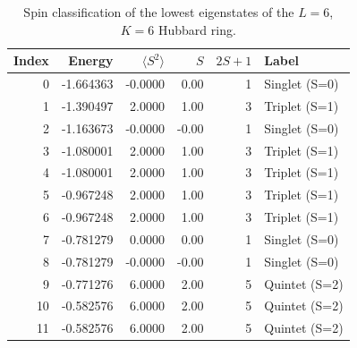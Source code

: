 \begin{table}[htbp]
  \centering
  \caption{Spin classification of the lowest eigenstates of the $L=6$, $K=6$ Hubbard ring.}
  \label{tab:spin-l6-ne6-31d31f}
  \begin{tabular}{rrrrrl}
    \hline\hline
    Index & Energy & $\langle S^2\rangle$ & $S$ & $2S+1$ & Label \\
    \hline
    0 & -1.664363 & -0.0000 & 0.00 & 1 & Singlet (S=0) \\
    1 & -1.390497 & 2.0000 & 1.00 & 3 & Triplet (S=1) \\
    2 & -1.163673 & -0.0000 & -0.00 & 1 & Singlet (S=0) \\
    3 & -1.080001 & 2.0000 & 1.00 & 3 & Triplet (S=1) \\
    4 & -1.080001 & 2.0000 & 1.00 & 3 & Triplet (S=1) \\
    5 & -0.967248 & 2.0000 & 1.00 & 3 & Triplet (S=1) \\
    6 & -0.967248 & 2.0000 & 1.00 & 3 & Triplet (S=1) \\
    7 & -0.781279 & 0.0000 & 0.00 & 1 & Singlet (S=0) \\
    8 & -0.781279 & -0.0000 & -0.00 & 1 & Singlet (S=0) \\
    9 & -0.771276 & 6.0000 & 2.00 & 5 & Quintet (S=2) \\
    10 & -0.582576 & 6.0000 & 2.00 & 5 & Quintet (S=2) \\
    11 & -0.582576 & 6.0000 & 2.00 & 5 & Quintet (S=2) \\
    \hline\hline
  \end{tabular}
\end{table}
